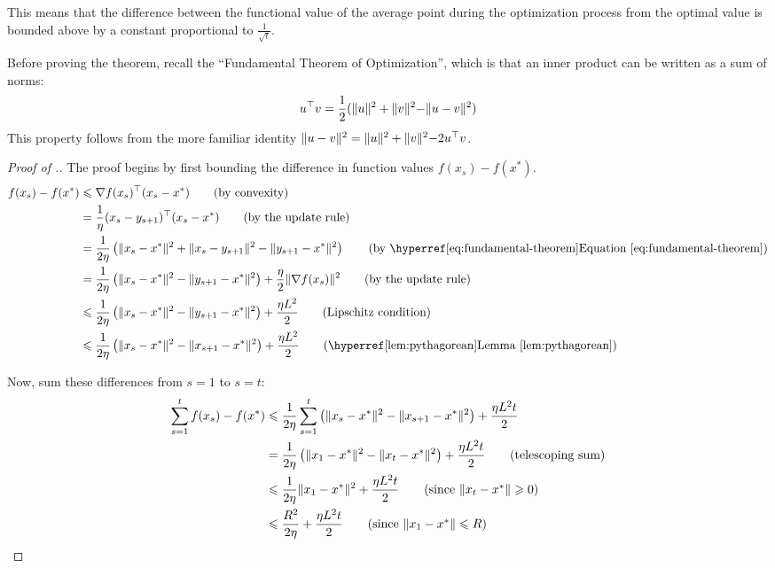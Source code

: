 This means that the difference between the functional value of the average
point during the optimization process from the optimal value is bounded above
by a constant proportional to $\frac{1}{\sqrt{t}}$.

Before proving the theorem, recall the ``Fundamental Theorem of Optimization'',
which is that an inner product can be written as a sum of norms: 
\begin{equation}
\equationlabel{fundamental-theorem}
u^\trans v = \frac{1}{2}(\lVert u \rVert^2 + \lVert v \lVert^2 - \lVert u - v \rVert^2)
\end{equation}
This property follows from the more familiar identity $\lVert u - v \rVert^2 = \lVert u \rVert^2 + \lVert v \lVert^2 - 2 u^\top v$.

\begin{proof}[Proof of .]
The proof begins by first bounding the difference in function values $f(x_s) -
f(x^*)$.
%
\begin{align}
    f(x_s) - f(x^*) &\leq \nabla f(x_s)^\trans (x_s - x^*)
\tag{by convexity}\\
    &= \frac{1}{\eta}(x_s - y_{s+1})^\trans(x_s - x^*) \tag{by the update rule} \\
    &= \frac{1}{2\eta} \left(\lVert x_s - x^* \rVert^2 + \lVert x_s - y_{s+1}
\rVert^2 - \lVert y_{s+1} - x^* \rVert^2 \right) \tag{by
\equationref{fundamental-theorem}} \\
    &= \frac{1}{2\eta} \left(\lVert x_s - x^* \rVert^2 - \lVert y_{s+1} - x^*
\rVert^2 \right) + \frac{\eta}{2} \lVert \nabla f(x_s) \rVert^2 \tag{by the
update rule} \\
    &\leq \frac{1}{2\eta} \left(\lVert x_s - x^* \rVert^2 - \lVert y_{s+1} - x^*
\rVert^2 \right) + \frac{\eta L^2}{2} \tag{Lipschitz condition} \\
    &\leq \frac{1}{2\eta} \left(\lVert x_s - x^* \rVert^2 - \lVert x_{s+1} - x^*
\rVert^2 \right) + \frac{\eta L^2}{2} \tag{\lemmaref{pythagorean}}
\end{align}

Now, sum these differences from $s=1$ to $s=t$:
\begin{align}
   \sum_{s=1}^t f(x_s) - f(x^*) &\leq  \frac{1}{2\eta} \sum_{s=1}^t \left(\lVert
x_s - x^* \rVert^2 - \lVert x_{s+1} - x^* \rVert^2 \right) + \frac{\eta L^2
t}{2} \notag \\
   &= \frac{1}{2\eta} \left(\lVert x_1 - x^* \rVert^2 - \lVert x_{t} - x^{*}
\rVert^2 \right) + \frac{\eta L^2 t}{2} \tag{telescoping sum} \\
   &\leq \frac{1}{2\eta} \lVert x_1 - x^* \rVert^2 + \frac{\eta L^2 t}{2} 
\tag{since $\|x_t-x^*\|\ge0$} \\
   &\leq \frac{R^2}{2\eta} + \frac{\eta L^2 t}{2} 
\tag{since $\|x_1-x^*\|\le R$}
\end{align}


\end{proof}
